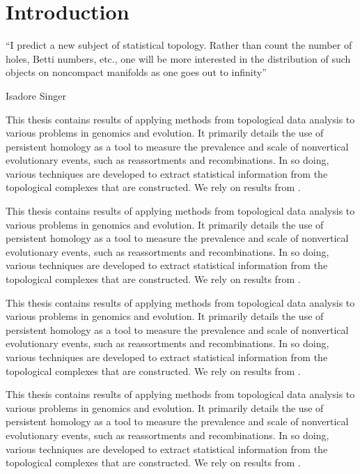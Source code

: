 \chapter{Introduction}
\label{ch:introduction}

\epigraph{``I predict a new subject of statistical topology. Rather than count the
number of holes, Betti numbers, etc., one will be more interested in the
distribution of such objects on noncompact manifolds as one goes out
to infinity''}{Isadore Singer}

This thesis contains results of applying methods from topological data analysis to various problems in genomics and evolution.
It primarily details the use of persistent homology as a tool to measure the prevalence and scale of nonvertical evolutionary events, such as reassortments and recombinations.
In so doing, various techniques are developed to extract statistical information from the topological complexes that are constructed.
We rely on results from \cite{Grosz_and_Sidner_1986}.

This thesis contains results of applying methods from topological data analysis to various problems in genomics and evolution.
It primarily details the use of persistent homology as a tool to measure the prevalence and scale of nonvertical evolutionary events, such as reassortments and recombinations.
In so doing, various techniques are developed to extract statistical information from the topological complexes that are constructed.
We rely on results from \cite{Grosz_and_Sidner_1986}.

This thesis contains results of applying methods from topological data analysis to various problems in genomics and evolution.
It primarily details the use of persistent homology as a tool to measure the prevalence and scale of nonvertical evolutionary events, such as reassortments and recombinations.
In so doing, various techniques are developed to extract statistical information from the topological complexes that are constructed.
We rely on results from \cite{Grosz_and_Sidner_1986}.

This thesis contains results of applying methods from topological data analysis to various problems in genomics and evolution.
It primarily details the use of persistent homology as a tool to measure the prevalence and scale of nonvertical evolutionary events, such as reassortments and recombinations.
In so doing, various techniques are developed to extract statistical information from the topological complexes that are constructed.
We rely on results from \cite{Grosz_and_Sidner_1986}.

